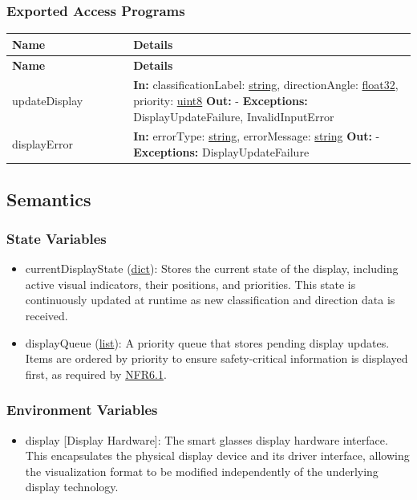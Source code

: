 \documentclass[12pt, titlepage]{article}
\newenvironment{apitable}{%
\begin{center}
\begin{longtable}{|p{0.3\linewidth}|p{0.7\linewidth}|} 
\hline
\textbf{Name} & \textbf{Details} \\
\hline
\endfirsthead
\hline
\textbf{Name} & \textbf{Details} \\
\hline
\endhead
\hline
\endfoot
\hline
\endlastfoot
}{%
\end{longtable}
\end{center}
}
\newcommand{\apifunc}[4]{%
#1 & 
\textbf{In:} #2 \newline
\textbf{Out:} #3 \newline
\textbf{Exceptions:} #4 \\
\hline
}
\begin{document}
\subsubsection{Exported Access Programs}
\begin{apitable}
  \apifunc{updateDisplay}
    {classificationLabel: \hyperref[generic:string]{string},
    directionAngle: \hyperref[generic:float32]{float32}, 
    priority: \hyperref[generic:uint8]{uint8}}
    {-}
    {DisplayUpdateFailure, InvalidInputError}
  \apifunc{displayError}
    {errorType: \hyperref[generic:string]{string},
    errorMessage: \hyperref[generic:string]{string}}
    {-}
    {DisplayUpdateFailure}
\end{apitable}

\subsection{Semantics}

\subsubsection{State Variables}

\begin{itemize}
  \item currentDisplayState (\hyperref[ds:dict]{dict}): 
    \label{var:currentDisplayState}
    Stores the current state of the display, including active visual indicators,
    their positions, and priorities. This state is continuously updated at
    runtime as new classification and direction data is received.
  \item displayQueue (\hyperref[ds:list]{list}): 
    \label{var:displayQueue}
    A priority queue that stores pending display updates. Items are ordered by
    priority to ensure safety-critical information is displayed first, as
    required by \hyperref[SRS-NFR6_1]{NFR6.1}.
\end{itemize}

\subsubsection{Environment Variables}

\begin{itemize}
  \item display [Display Hardware]: The smart glasses display hardware
    interface. This encapsulates the physical display device and its driver
    interface, allowing the visualization format to be modified independently of
    the underlying display technology.
\end{itemize}
\end{document}
